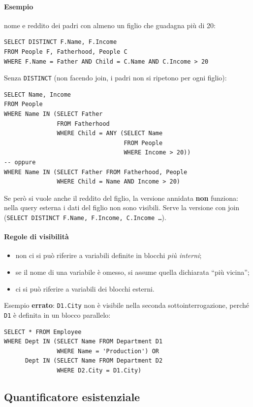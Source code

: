\documentclass[a4paper,12pt]{article}
\begin{document}
\paragraph{Esempio} nome e reddito dei padri con almeno un figlio che guadagna
più di 20:
\begin{verbatim}
SELECT DISTINCT F.Name, F.Income
FROM People F, Fatherhood, People C
WHERE F.Name = Father AND Child = C.Name AND C.Income > 20
\end{verbatim}
Senza \texttt{DISTINCT} (non facendo join, i padri non si ripetono per ogni
figlio):
\begin{verbatim}
SELECT Name, Income
FROM People
WHERE Name IN (SELECT Father
               FROM Fatherhood
               WHERE Child = ANY (SELECT Name
                                  FROM People
                                  WHERE Income > 20))
-- oppure
WHERE Name IN (SELECT Father FROM Fatherhood, People
               WHERE Child = Name AND Income > 20)
\end{verbatim}
Se però si vuole anche il reddito del figlio, la versione annidata
\textbf{non} funziona: nella query esterna i dati del figlio non sono visibili.
Serve la versione con join (\texttt{SELECT DISTINCT F.Name, F.Income, C.Income
\dots}).

\paragraph{Regole di visibilità}
\begin{itemize}
  \item non ci si può riferire a variabili definite in blocchi \emph{più
    interni};
  \item se il nome di una variabile è omesso, si assume quella dichiarata
    ``più vicina'';
  \item ci si può riferire a variabili dei blocchi esterni.
\end{itemize}
Esempio \textbf{errato}: \texttt{D1.City} non è visibile nella seconda
sottointerrogazione, perché \texttt{D1} è definita in un blocco parallelo:
\begin{verbatim}
SELECT * FROM Employee
WHERE Dept IN (SELECT Name FROM Department D1
               WHERE Name = 'Production') OR
      Dept IN (SELECT Name FROM Department D2
               WHERE D2.City = D1.City)
\end{verbatim}

\subsection{Quantificatore esistenziale}
\end{document}
